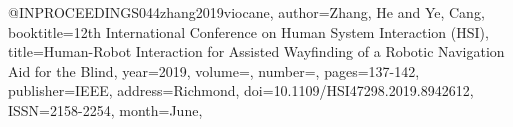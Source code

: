 @INPROCEEDINGS{044zhang2019viocane,
author={Zhang, He and Ye, Cang},
booktitle={12th International Conference on Human System Interaction (HSI)}, 
title={Human-Robot Interaction for Assisted Wayfinding of a Robotic Navigation Aid for the Blind}, 
year={2019},
volume={},
number={},
pages={137-142},
publisher={IEEE},
address={Richmond},
doi={10.1109/HSI47298.2019.8942612},
ISSN={2158-2254},
month={June},}